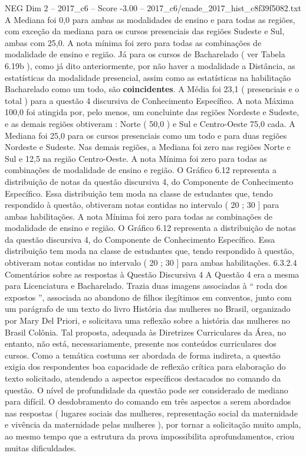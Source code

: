 \begin{textsample}{NEG Dim 2 – 2017\_c6 – Score -3.00 – 2017\_c6/enade\_2017\_hist\_c8f39f5082.txt}
A Mediana foi 0,0 para ambas as modalidades de ensino e para todas as regiões, com exceção da mediana para os cursos presenciais das regiões Sudeste e Sul, ambas com 25,0.
A nota mínima foi zero para todas as combinações de modalidade de ensino e região.
Já para os cursos de Bacharelado ( ver Tabela 6.19b ), como já dito anteriormente, por não haver a modalidade a Distância, as estatísticas da modalidade presencial, assim como as estatísticas na habilitação Bacharelado como um todo, são \textbf{coincidentes}.
A Média foi 23,1 ( presenciais e o total ) para a questão 4 discursiva de Conhecimento Específico.
A nota Máxima 100,0 foi atingida por, pelo menos, um concluinte das regiões Nordeste e Sudeste, e as demais regiões obtiveram : Norte ( 50,0 ) e Sul e Centro-Oeste 75,0 cada.
A Mediana foi 25,0 para os cursos presenciais como um todo e para duas regiões Nordeste e Sudeste.
Nas demais regiões, a Mediana foi zero nas regiões Norte e Sul e 12,5 na região Centro-Oeste.
A nota Mínima foi zero para todas as combinações de modalidade de ensino e região.
O Gráfico 6.12 representa a distribuição de notas da questão discursiva 4, do Componente de Conhecimento Específico.
Essa distribuição tem moda na classe de estudantes que, tendo respondido à questão, obtiveram notas contidas no intervalo ( 20 ; 30 ] para ambas habilitações.
A nota Mínima foi zero para todas as combinações de modalidade de ensino e região.
O Gráfico 6.12 representa a distribuição de notas da questão discursiva 4, do Componente de Conhecimento Específico.
Essa distribuição tem moda na classe de estudantes que, tendo respondido à questão, obtiveram notas contidas no intervalo ( 20 ; 30 ] para ambas habilitações. 6.3.2.4 Comentários sobre as respostas à Questão Discursiva 4 A Questão 4 era a mesma para Licenciatura e Bacharelado.
Trazia duas imagens associadas à “ roda dos expostos ”, associada ao abandono de filhos ilegítimos em conventos, junto com um parágrafo de um texto do livro História das mulheres no Brasil, organizado por Mary Del Priori, e solicitava uma reflexão sobre a história das mulheres no Brasil Colônia.
Tal proposta, adequada às Diretrizes Curriculares da Área, no entanto, não está, necessariamente, presente nos conteúdos curriculares dos cursos.
Como a temática costuma ser abordada de forma indireta, a questão exigia dos respondentes boa capacidade de reflexão crítica para elaboração do texto solicitado, atendendo a aspectos específicos destacados no comando da questão.
O nível de profundidade da questão pode ser considerado de mediano para difícil.
O desdobramento do comando em três aspectos a serem abordados nas respostas ( lugares sociais das mulheres, representação social da maternidade e vivência da maternidade pelas mulheres ), por tornar a solicitação muito ampla, ao mesmo tempo que a estrutura da prova impossibilita aprofundamentos, criou muitas dificuldades.

\end{textsample}
